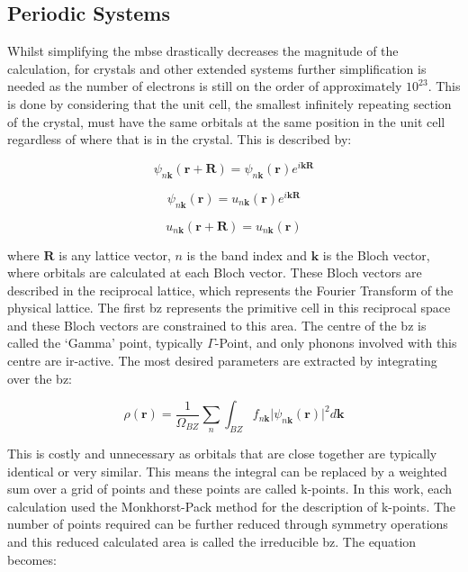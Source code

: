 \subsection{Periodic Systems}
\label{subsec:bloch}
Whilst simplifying the \acrshort{mbse} drastically decreases the magnitude of the calculation, for crystals and other extended systems further simplification is needed as the number of electrons is still on the order of approximately \(10^{23}\). This is done by considering that the unit cell, the smallest infinitely repeating section of the crystal, must have the same orbitals at the same position in the unit cell regardless of where that is in the crystal. This is described by:

\begin{equation}
\psi_{n\mathbf{k}}(\mathbf{r} + \mathbf{R}) = \psi_{n\mathbf{k}}(\mathbf{r})e^{i\mathbf{k}\mathbf{R}}
\end{equation}

\begin{equation}
\psi_{n\mathbf{k}}(\mathbf{r}) = u_{n\mathbf{k}}(\mathbf{r})e^{i\mathbf{k}\mathbf{R}}
\end{equation}

\begin{equation}
u_{n\mathbf{k}}(\mathbf{r} + \mathbf{R}) = u_{n\mathbf{k}}(\mathbf{r})
\end{equation}

where \(\mathbf{R}\) is any lattice vector, \(n\) is the band index and \(\mathbf{k}\) is the Bloch vector, where orbitals are calculated at each Bloch vector. These Bloch vectors are described in the reciprocal lattice, \DIFdelbegin {}\DIFdelend which represents the Fourier Transform of the physical lattice. The first \acrfull{bz} represents the primitive cell in this reciprocal space and these Bloch vectors are constrained to this area. The centre of the \acrshort{bz} is called the `Gamma' point, typically \(\Gamma\)-Point, and only phonons involved with this centre are \acrshort{ir}\nobreakdash-active. The most desired parameters are extracted by integrating over the \acrshort{bz}:

\begin{equation}
\rho(\mathbf{r}) = \frac{1}{\Omega_{BZ}} \sum_n \int_{BZ} f_{n\mathbf{k}} \lvert \psi_{n\mathbf{k}}(\mathbf{r}) \rvert^2 d\mathbf{k}
\end{equation}

\DIFdelbegin {}\DIFdelend This is costly and unnecessary as orbitals that are close together are typically identical or very similar. This means the integral can be replaced by a weighted sum over a grid of points and these points are called k\nobreakdash-points. In this work, each calculation used the Monkhorst-Pack \DIFdelbegin \DIFdel{~}\DIFdelend \cite{Monkhorst1976} method for the description of k-points. The number of points required can be further reduced through symmetry operations and this reduced calculated area is called the irreducible \acrshort{bz}. The equation becomes: 

